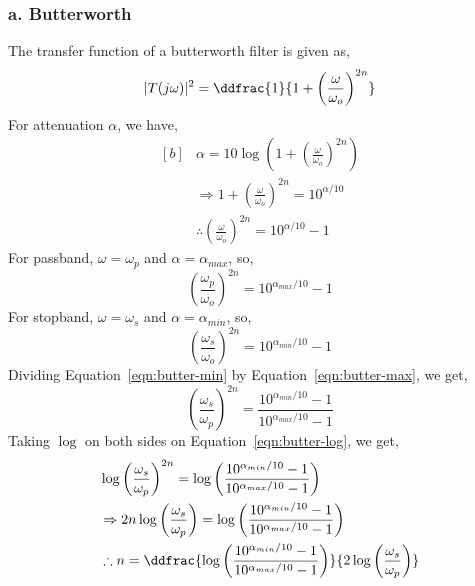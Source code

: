 \subsubsection*{a. Butterworth}
The transfer function of a butterworth filter is given as,
\begin{equation}
   |T(j\omega)|^2=\ddfrac{1}{1+\left(\frac{\omega}{\omega_o}\right)^{2n}}
\end{equation}
For attenuation $\alpha$, we have,
\begin{equation}
   \begin{aligned}[b]
     &\alpha=10\log{\left(1+\left(\frac{\omega}{\omega_o}\right)^{2n}\right)}\\
      &\Rightarrow 1+\left(\frac{\omega}{\omega_o}\right)^{2n}=10^{\alpha/10}\\
      &\therefore \left(\frac{\omega}{\omega_o}\right)^{2n} = 10^{\alpha/10} -1 
   \end{aligned}
\end{equation}
For passband, $\omega=\omega_p$ and $\alpha=\alpha_{max}$, so,
\begin{equation}
   \left(\frac{\omega_p}{\omega_o}\right)^{2n} = 10^{\alpha_{max}/10} -1 
   \label{eqn:butter-max}
\end{equation}
For stopband, $\omega=\omega_s$ and $\alpha=\alpha_{min}$, so,
\begin{equation}
   \left(\frac{\omega_s}{\omega_o}\right)^{2n} = 10^{\alpha_{min}/10} -1 
   \label{eqn:butter-min}
\end{equation}
Dividing Equation~\ref{eqn:butter-min} by Equation~\ref{eqn:butter-max}, we get,
\begin{equation}
   \left(\frac{\omega_s}{\omega_p}\right)^{2n}=\frac{10^{\alpha_{min}/10} -1}{10^{\alpha_{max}/10} -1 }
   \label{eqn:butter-log}
\end{equation}
Taking $\log$ on both sides on Equation~\ref{eqn:butter-log}, we get,
\begin{equation}
   \begin{aligned}[b]
      &\log{\left(\frac{\omega_s}{\omega_p}\right)^{2n}}=\log{\left(\frac{10^{\alpha_{min}/10} -1}{10^{\alpha_{max}/10} -1}\right)}\\
     &\Rightarrow 2n\log{\left(\frac{\omega_s}{\omega_p}\right)}=\log{\left(\frac{10^{\alpha_{min}/10} -1}{10^{\alpha_{max}/10} -1}\right)}\\
     &\therefore n=\ddfrac{\log{\left(\frac{10^{\alpha_{min}/10} -1}{10^{\alpha_{max}/10} -1}\right)}}{2\log{\left(\frac{\omega_s}{\omega_p}\right)}}
   \end{aligned}
   \label{eqn:butter-final}
\end{equation}
